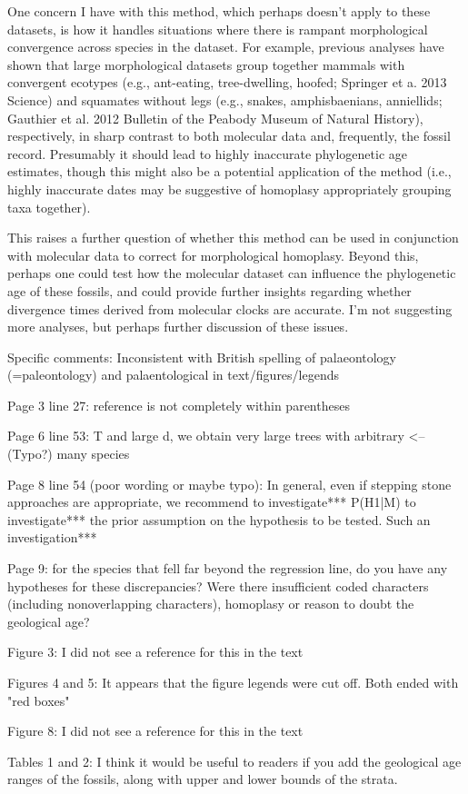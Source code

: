 \documentclass[11pt]{article}
\begin{document}
One concern I have with this method, which perhaps doesn't apply to these datasets, is how it handles situations where there is rampant morphological convergence across species in the dataset. For example, previous analyses have shown that large morphological datasets group together mammals with convergent ecotypes (e.g., ant-eating, tree-dwelling, hoofed; Springer et a. 2013 Science) and squamates without legs (e.g., snakes, amphisbaenians, anniellids; Gauthier et al. 2012 Bulletin of the Peabody Museum of Natural History), respectively, in sharp contrast to both molecular data and, frequently, the fossil record. Presumably it should lead to highly inaccurate phylogenetic age estimates, though this might also be a potential application of the method (i.e., highly inaccurate dates may be suggestive of homoplasy appropriately grouping taxa together).

This raises a further question of whether this method can be used in conjunction with molecular data to correct for morphological homoplasy. Beyond this, perhaps one could test how the molecular dataset can influence the phylogenetic age of these fossils, and could provide further insights regarding whether divergence times derived from molecular clocks are accurate. I'm not suggesting more analyses, but perhaps further discussion of these issues.

Specific comments:
Inconsistent with British spelling of palaeontology (=paleontology) and palaentological in text/figures/legends

Page 3 line 27: reference is not completely within parentheses

Page 6 line 53: T and large d, we obtain very large trees with arbitrary <--(Typo?) many species

Page 8 line 54 (poor wording or maybe typo): In general, even if stepping stone approaches are appropriate, we recommend to investigate*** P(H1|M) to investigate*** the prior assumption on the hypothesis to be tested. Such an investigation***

Page 9: for the species that fell far beyond the regression line, do you have any hypotheses for these discrepancies? Were there insufficient coded characters (including nonoverlapping characters), homoplasy or reason to doubt the geological age?

Figure 3: I did not see a reference for this in the text

Figures 4 and 5: It appears that the figure legends were cut off. Both ended with "red boxes"

Figure 8: I did not see a reference for this in the text

Tables 1 and 2: I think it would be useful to readers if you add the geological age ranges of the fossils, along with upper and lower bounds of the strata.
\end{document}
